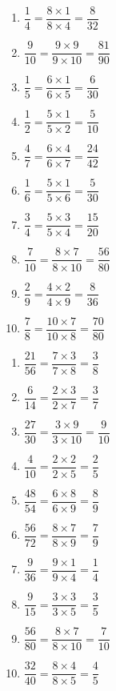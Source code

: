 \documentclass[a4paper,11pt,fleqn]{article}
\begin{document}
\begin{correction}
\exo{}

\begin{multicols}{2}
\begin{enumerate}[itemsep=2em]
	\item $ \dfrac{1}{4} = \dfrac{8 \times 1}{8 \times 4} = \dfrac{8}{32} $
	\item $ \dfrac{9}{10} = \dfrac{9 \times 9}{9 \times 10} = \dfrac{81}{90} $
	\item $ \dfrac{1}{5} = \dfrac{6 \times 1}{6 \times 5} = \dfrac{6}{30} $
	\item $ \dfrac{1}{2} = \dfrac{5 \times 1}{5 \times 2} = \dfrac{5}{10} $
	\item $ \dfrac{4}{7} = \dfrac{6 \times 4}{6 \times 7} = \dfrac{24}{42} $
	\item $ \dfrac{1}{6} = \dfrac{5 \times 1}{5 \times 6} = \dfrac{5}{30} $
	\item $ \dfrac{3}{4} = \dfrac{5 \times 3}{5 \times 4} = \dfrac{15}{20} $
	\item $ \dfrac{7}{10} = \dfrac{8 \times 7}{8 \times 10} = \dfrac{56}{80} $
	\item $ \dfrac{2}{9} = \dfrac{4 \times 2}{4 \times 9} = \dfrac{8}{36} $
	\item $ \dfrac{7}{8} = \dfrac{10 \times 7}{10 \times 8} = \dfrac{70}{80} $
\end{enumerate}
\end{multicols}

\exo{}

\begin{multicols}{2}
\begin{enumerate}[itemsep=2em]
	\item $ \dfrac{21}{56} = \dfrac{7 \times 3}{7 \times 8} = \dfrac{3}{8} $
	\item $ \dfrac{6}{14} = \dfrac{2 \times 3}{2 \times 7} = \dfrac{3}{7} $
	\item $ \dfrac{27}{30} = \dfrac{3 \times 9}{3 \times 10} = \dfrac{9}{10} $
	\item $ \dfrac{4}{10} = \dfrac{2 \times 2}{2 \times 5} = \dfrac{2}{5} $
	\item $ \dfrac{48}{54} = \dfrac{6 \times 8}{6 \times 9} = \dfrac{8}{9} $
	\item $ \dfrac{56}{72} = \dfrac{8 \times 7}{8 \times 9} = \dfrac{7}{9} $
	\item $ \dfrac{9}{36} = \dfrac{9 \times 1}{9 \times 4} = \dfrac{1}{4} $
	\item $ \dfrac{9}{15} = \dfrac{3 \times 3}{3 \times 5} = \dfrac{3}{5} $
	\item $ \dfrac{56}{80} = \dfrac{8 \times 7}{8 \times 10} = \dfrac{7}{10} $
	\item $ \dfrac{32}{40} = \dfrac{8 \times 4}{8 \times 5} = \dfrac{4}{5} $
\end{enumerate}
\end{multicols}


\end{correction}
\end{document}
